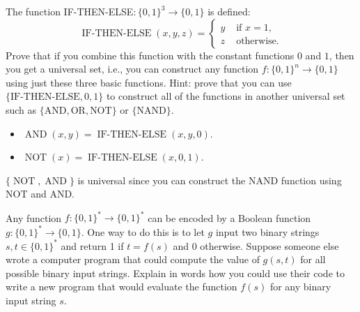 \documentclass[12pt]{exam}
\newcommand{\on}{\operatorname}
\begin{document}
\begin{questions}
\question The function IF-THEN-ELSE$:\{0,1\}^3 \rightarrow \{0,1\}$ is defined: 
$$\on{IF-THEN-ELSE}(x,y,z) = \begin{cases} y & \text{ if } x = 1, \\ z & \text{ otherwise.}\end{cases}$$ 
Prove that if you combine this function with the constant functions $0$ and $1$, then you get a universal set, i.e., you can construct any function $f:\{0,1\}^n \rightarrow \{0,1\}$ using just these three basic functions.  Hint: prove that you can use $\{\text{IF-THEN-ELSE}, 0, 1\}$ to construct all of the functions in another universal set such as $\{\text{AND},\text{OR},\text{NOT}\}$ or $\{\text{NAND}\}$.  
\begin{solution}
\begin{itemize}
\item $\on{AND}(x,y) = \on{IF-THEN-ELSE}(x,y,0)$.  
\item $\on{NOT}(x) = \on{IF-THEN-ELSE}(x,0,1)$.
\end{itemize}
$\{\on{NOT},\on{AND}\}$ is universal since you can construct the NAND function using NOT and AND.
\end{solution}
\vfill




\question Any function $f:\{0,1\}^* \rightarrow \{0,1\}^*$ can be encoded by a Boolean function $g:\{0,1\}^* \rightarrow \{0,1\}$. One way to do this is to let $g$ input two binary strings $s,t \in \{0,1\}^*$ and return 1 if $t = f(s)$ and 0 otherwise.  Suppose someone else wrote a computer program that could compute the value of $g(s,t)$ for all possible binary input strings.  Explain in words how you could use their code to write a new program that would evaluate the function $f(s)$ for any binary input string $s$. 
\begin{solution}


\end{solution}
\end{questions}
\end{document}
